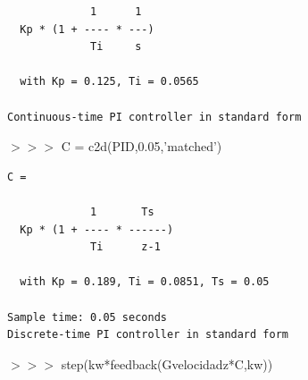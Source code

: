 \begin{tcolorbox}[sharp corners, colframe=bluebox, title= Controlador Rivera-Morari, breakable=unlimited]
\begin{tcolorbox}[sharp corners, colback = white]
\begin{verbatim}
             1      1 
  Kp * (1 + ---- * ---)
             Ti     s 

  with Kp = 0.125, Ti = 0.0565
 
Continuous-time PI controller in standard form
\end{verbatim}
  \end{tcolorbox}%
  \vspace*{0.5em}

$>>>$ C = c2d(PID,0.05,'matched')

    \vspace*{0.5em}
  \begin{tcolorbox}[sharp corners, colback = white]
    \color{gray}
\begin{verbatim}
C =
 
             1       Ts  
  Kp * (1 + ---- * ------)
             Ti      z-1 

  with Kp = 0.189, Ti = 0.0851, Ts = 0.05
 
Sample time: 0.05 seconds
Discrete-time PI controller in standard form

\end{verbatim}
  \end{tcolorbox}%
  $>>>$  step(kw*feedback(Gvelocidadz*C,kw))
      \vspace*{0.5em}
  \end{tcolorbox}%